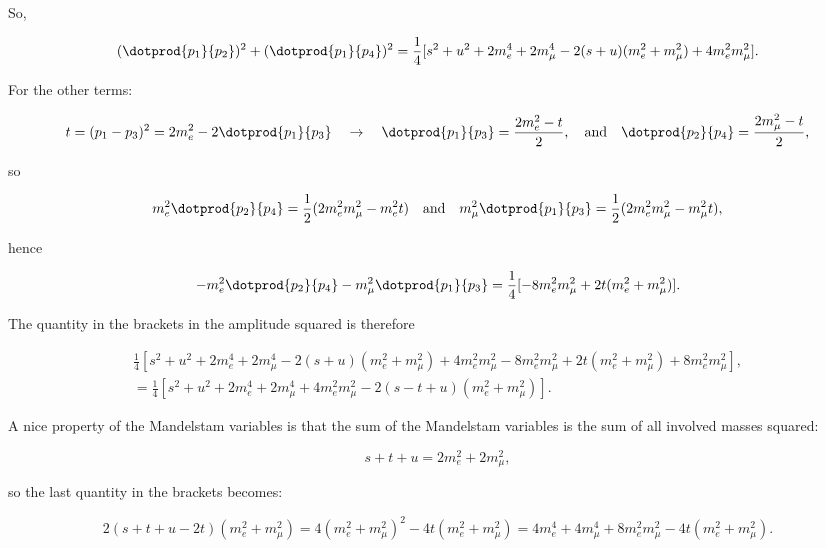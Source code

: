 So,

\begin{equation*}
    (\dotprod{p_1}{p_2})^2 + (\dotprod{p_1}{p_4})^2 = \frac{1}{4}[s^2 + u^2 + 2m_e^4 + 2m_{\mu}^4 - 2(s+u)(m_e^2 + m_{\mu}^2) + 4m_e^2m_{\mu}^2].
\end{equation*}

For the other terms:

\begin{equation*}
    t = (p_1 - p_3)^2 = 2m_e^2 - 2\dotprod{p_1}{p_3} \quad \rightarrow \quad \dotprod{p_1}{p_3} = \frac{2m_e^2 - t}{2}, \quad \mathrm{and} \quad \dotprod{p_2}{p_4} = \frac{2m_{\mu}^2 - t}{2},
\end{equation*}

so

\begin{equation*}
    m_e^2 \dotprod{p_2}{p_4} = \frac{1}{2}(2m_e^2m_{\mu}^2 - m_e^2t) \quad \mathrm{and} \quad m_{\mu}^2 \dotprod{p_1}{p_3} = \frac{1}{2}(2m_e^2m_{\mu}^2 - m_{\mu}^2t),
\end{equation*}

hence

\begin{equation*}
    -m_e^2 \dotprod{p_2}{p_4} - m_{\mu}^2 \dotprod{p_1}{p_3} = \frac{1}{4}[-8m_e^2m_{\mu}^2 + 2t(m_e^2 + m_{\mu}^2)].
\end{equation*}

The quantity in the brackets in the amplitude squared is therefore

\begin{gather*}
    \frac{1}{4}[s^2 + u^2 + 2m_e^4 + 2m_{\mu}^4 - 2(s+u)(m_e^2 + m_{\mu}^2) + 4m_e^2m_{\mu}^2 - 8m_e^2m_{\mu}^2 + 2t(m_e^2 + m_{\mu}^2) + 8m_e^2m_{\mu}^2], \\
    = \frac{1}{4}[s^2 + u^2 + 2m_e^4 + 2m_{\mu}^4 + 4m_e^2m_{\mu}^2 - 2(s-t+u)(m_e^2 + m_{\mu}^2)].
\end{gather*}

A nice property of the Mandelstam variables is that the sum of the Mandelstam variables is the sum of all involved masses squared:

\begin{equation*}
    s+t+u = 2m_e^2 + 2m_{\mu}^2,
\end{equation*}

so the last quantity in the brackets becomes:

\begin{equation*}
    2(s+t+u - 2t)(m_e^2 + m_{\mu}^2) = 4(m_e^2 + m_{\mu}^2)^2 - 4t(m_e^2 + m_{\mu}^2) = 4m_e^4 + 4m_{\mu}^4 + 8m_e^2m_{\mu}^2 - 4t(m_e^2 + m_{\mu}^2).
\end{equation*}

